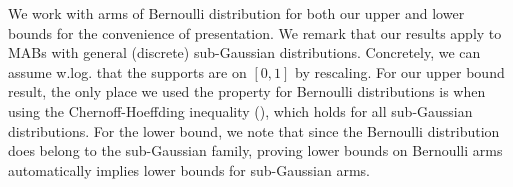 \begin{remark}
\label{rmk:general-sub-gaussian}
We work with arms of Bernoulli distribution for both our upper and lower bounds for the convenience of presentation. We remark that our results apply to MABs with general (discrete) sub-Gaussian distributions. Concretely, we can assume w.log. that the supports are on $[0,1]$ by rescaling. For our upper bound result, the only place we used the property for Bernoulli distributions is when using the Chernoff-Hoeffding inequality (), which holds for all sub-Gaussian distributions.
For the lower bound, we note that since the Bernoulli distribution does belong to the sub-Gaussian family, proving lower bounds on Bernoulli arms automatically implies lower bounds for sub-Gaussian arms.
\end{remark}

